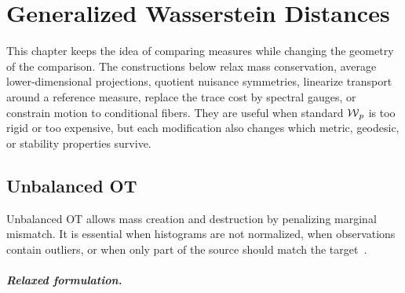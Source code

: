 
\chapter{Generalized Wasserstein Distances}
\label{sec-extensions}
\label{sec-generalized-wasserstein-distances}

This chapter keeps the idea of comparing measures while changing the geometry of the comparison. The constructions below relax mass conservation, average lower-dimensional projections, quotient nuisance symmetries, linearize transport around a reference measure, replace the trace cost by spectral gauges, or constrain motion to conditional fibers. They are useful when standard $\operatorname{\mathcal{W}}_p$ is too rigid or too expensive, but each modification also changes which metric, geodesic, or stability properties survive.

\section{Unbalanced OT}
\label{sec-unbalanced}

Unbalanced OT allows mass creation and destruction by penalizing marginal mismatch. It is essential when histograms are not normalized, when observations contain outliers, or when only part of the source should match the target~\cite{LieroMielkeSavareLong,2015-chizat-unbalanced,2017-chizat-focm}.

\paragraph{Relaxed formulation.}


